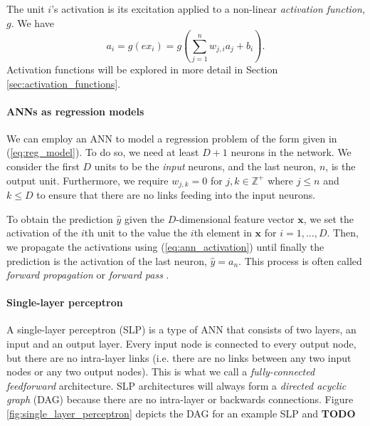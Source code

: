 \documentclass[oneside]{book}
\renewcommand\vec{\mathbf}
\newcommand{\todo}{{\color{red} \textbf{TODO} }}
\begin{document}
The unit $i$'s activation is its excitation applied to a non-linear \textit{activation function}, $g$. We have
\begin{equation}
    \label{eq:ann_activation}
    a_i = g\left({ex}_i\right) = g\left(\sum_{j=1}^n{w_{j,i} a_j} + b_i\right).
\end{equation}
Activation functions will be explored in more detail in Section \ref{sec:activation_functions}. 


\paragraph{ANNs as regression models}
We can employ an ANN to model a regression problem of the form given in (\ref{eq:reg_model}). 
To do so, we need at least $D+1$ neurons in the network. 
We consider the first $D$ units to be the \textit{input} neurons, and the last neuron, $n$, is the output unit.
Furthermore, we require $w_{j,k}=0$ for $j,k \in \mathbb{Z}^+$ where $j \leq n$ and $k \leq D$ to ensure that there are no links feeding into the input neurons.

To obtain the prediction $\hat{y}$ given the $D$-dimensional feature vector $\vec{x}$, we set the activation of the $i$th unit to the value the $i$th element in $\vec{x}$ for $i=1,\dots,D$.
Then, we propagate the activations using (\ref{eq:ann_activation}) until finally the prediction is the activation of the last neuron, $\hat{y}=a_n$.
This process is often called \textit{forward propagation} or \textit{forward pass} \cite{russell2010}.

\paragraph{Single-layer perceptron}
A single-layer perceptron (SLP) is a type of ANN that consists of two layers, an input and an output layer.
Every input node is connected to every output node, but there are no intra-layer links (i.e. there are no links between any two input nodes or any two output nodes). 
This is what we call a \textit{fully-connected feedforward} architecture.
SLP architectures will always form a \textit{directed acyclic graph} (DAG) because there are no intra-layer or backwards connections.
Figure \ref{fig:single_layer_perceptron} depicts the DAG for an example SLP and
\todo
\end{document}
